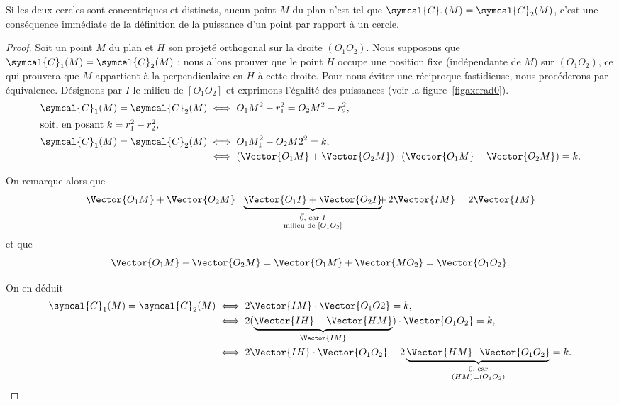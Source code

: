 \begin{remark}
Si les deux cercles sont concentriques et distincts, aucun point $M$ du plan n'est tel que $\symcal{C}_1(M)=\symcal{C}_2(M)$, c'est une conséquence immédiate de la définition de la puissance d'un point par rapport à un cercle.
\end{remark}

\begin{proof}
Soit un point $M$ du plan et $H$ son projeté orthogonal sur la droite $(O_1O_2)$. Nous supposons que $\symcal{C}_1(M)=\symcal{C}_2(M)$ ; nous allons prouver que le point $H$ occupe une position fixe (indépendante de $M$) sur $(O_1O_2)$, ce qui prouvera que $M$ appartient à la perpendiculaire en $H$ à cette droite. Pour nous éviter une réciproque fastidieuse, nous procéderons par équivalence. Désignons par $I$ le milieu de $[O_1O_2]$ et exprimons l'égalité des puissances (voir la figure~\ref{figaxerad0}).
\begin{align*}
\symcal{C}_1(M)=\symcal{C}_2(M) &\iff O_1M^2-r_1^2=O_2M^2-r_2^2,\\
\intertext{soit, en posant  $k=r_1^2-r_2^2$,}
\symcal{C}_1(M)=\symcal{C}_2(M) &\iff O_1M_1^2-O_2M2^2=k,\\
&\iff (\Vector{O_1M}+\Vector{O_2M})\cdot(\Vector{O_1M}-\Vector{O_2M})=k.
\end{align*}

On remarque alors que 
\begin{equation*}
\Vector{O_1M}+\Vector{O_2M}=\hspace{-0.5em}\underbrace{\Vector{O_1I}+\Vector{O_2I}}_{\substack{\vec{0}\text{, car } I\\\text{milieu de }[O_1O_2]}}\hspace{-0.5em}+\,2\Vector{IM}=2\Vector{IM}
\end{equation*}
et que
\begin{equation*}
\Vector{O_1M}-\Vector{O_2M}=\Vector{O_1M}+\Vector{MO_2}=\Vector{O_1O_2}.
\end{equation*}

On en déduit
\begin{align*}
\symcal{C}_1(M)=\symcal{C}_2(M) &\iff 2\Vector{IM}\cdot\Vector{O_1O2}=k,\\
&\iff 2(\underbrace{\Vector{IH}+\Vector{HM}}_{\Vector{IM}})\cdot\Vector{O_1O_2}=k,\\
&\iff 2\Vector{IH}\cdot\Vector{O_1O_2}+2\underbrace{\Vector{HM}\cdot\Vector{O_1O_2}}_{\substack{0 \text{, car}\\(HM)\perp(O_1O_2)}}=k.
\end{align*}


\end{proof}
